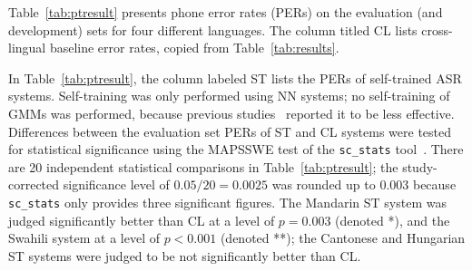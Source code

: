 Table~\ref{tab:ptresult} presents phone error rates (PERs) on the
evaluation (and development) sets for four different languages. The
column titled {\sc CL} lists cross-lingual baseline error rates,
copied from Table~\ref{tab:results}.

In Table~\ref{tab:ptresult}, the column labeled {\sc ST} lists the
PERs of self-trained ASR systems. Self-training was only performed
using NN systems; no self-training of GMMs was performed, because
previous studies~\cite{Huang2013} reported it to be less effective.
Differences between the evaluation set PERs of {\sc ST} and {\sc CL}
systems were tested for statistical significance using the MAPSSWE
test of the {\tt sc\_stats} tool~\cite{Pallet90}.  There are 20
independent statistical comparisons in Table~\ref{tab:ptresult}; the
study-corrected significance level of $0.05/20=0.0025$ was rounded up
to $0.003$ because {\tt sc\_stats} only provides three significant
figures.  The Mandarin {\sc ST} system was judged significantly better
than {\sc CL} at a level of $p=0.003$ (denoted *), and the Swahili
system at a level of $p<0.001$ (denoted **); the Cantonese and
Hungarian {\sc ST} systems were judged to be not significantly better
than {\sc CL}.

